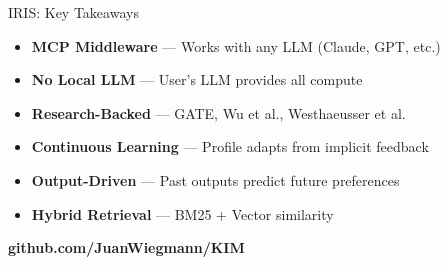 \documentclass[aspectratio=169,12pt]{beamer}
\begin{document}
\begin{frame}{IRIS: Key Takeaways}
\begin{itemize}
    \item \textbf{MCP Middleware} — Works with any LLM (Claude, GPT, etc.)
    \item \textbf{No Local LLM} — User's LLM provides all compute
    \item \textbf{Research-Backed} — GATE, Wu et al., Westhaeusser et al.
    \item \textbf{Continuous Learning} — Profile adapts from implicit feedback
    \item \textbf{Output-Driven} — Past outputs predict future preferences
    \item \textbf{Hybrid Retrieval} — BM25 + Vector similarity
\end{itemize}

\vspace{1cm}
\begin{center}
\textbf{github.com/JuanWiegmann/KIM}
\end{center}
\end{frame}
\end{document}
